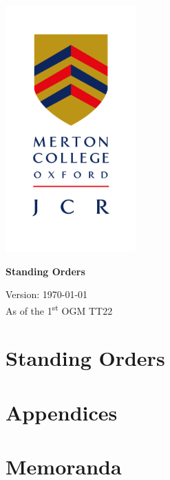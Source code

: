 \documentclass{standingorders}
\begin{document}
	\thispagestyle{empty}
	\begin{center}
		\includegraphics[width=5cm]{mertoncollegejcr}
		\begin{vplace}[0.1] \Huge  
			\textbf{Standing Orders}
		\end{vplace}
		{ {\Large
			Version: \today}\\
			\small As of the 1\textsuperscript{st} OGM TT22
			
		}
		\vfill
	\end{center}
	\cleardoublepage
	\frontmatter
	\tableofcontents
	
	
	\mainmatter
	\part{Standing Orders}
	
	
	
	
	
	
	
	
	
	
	
	\part{Appendices}
	\begin{appendices}
		
        
		
		
		
		
	\end{appendices}
	\part{Memoranda}
	\begin{appendices}
	\end{appendices}
\end{document}
